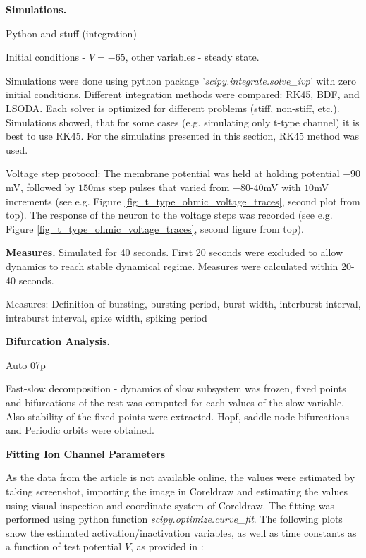 \documentclass[../main.tex]{subfiles}
\begin{document}
\noindent\textbf{Simulations.}

Python and stuff (integration)

Initial conditions - $V=-65$, other variables - steady state.

Simulations were done using python package '\textit{scipy.integrate.solve\_ivp}' with
zero initial conditions. Different integration methods were compared: RK45, BDF, and LSODA.
Each solver is optimized for different problems (stiff, non-stiff, etc.). Simulations
showed, that for some cases (e.g. simulating only t-type channel) it is best to use
RK45. For the simulatins presented in this section, RK45 method was used.

Voltage step protocol: The membrane potential was held at holding potential $-90$ mV,
followed by $150$ms step pulses that varied from $-80$-$40$mV with $10$mV increments
(see e.g. Figure \ref{fig_t_type_ohmic_voltage_traces}, second plot from top). The response
of the neuron to the voltage steps was recorded (see e.g. Figure \ref{fig_t_type_ohmic_voltage_traces}, second figure from top).

\noindent\textbf{Measures.}
Simulated for 40 seconds. First 20 seconds were excluded to allow dynamics to reach stable dynamical regime. Measures were calculated within 20-40 seconds.

Measures: Definition of bursting, bursting period, burst width, interburst interval, intraburst interval, spike width, spiking period

\noindent\textbf{Bifurcation Analysis.}

Auto 07p

Fast-slow decomposition - dynamics of slow subsystem was frozen, fixed points and bifurcations of the rest was computed for each values of the slow variable. Also stability of the fixed points were extracted. Hopf, saddle-node bifurcations and Periodic orbits were obtained.

\noindent\textbf{Fitting Ion Channel Parameters}

As the data from the article is not available online, the values were estimated by taking screenshot, importing the image in Coreldraw and estimating the values using visual inspection and coordinate system of Coreldraw. The fitting was performed using python function \textit{scipy.optimize.curve\_fit}.
The following plots show the estimated activation/inactivation variables, as well as time constants
as a function of test potential $V$, as provided in \parencite{jeongCaa1TFlyTtype2015}:
\end{document}
